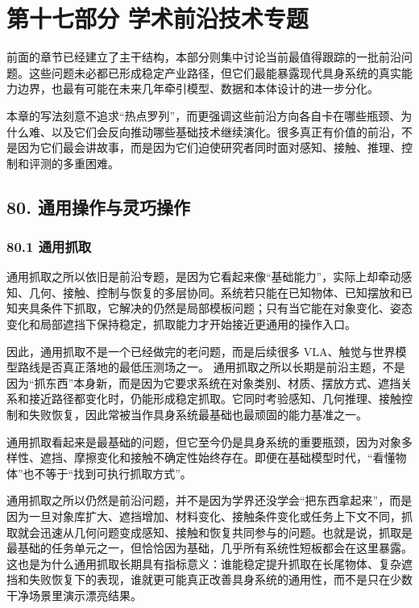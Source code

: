 
\part*{第十七部分 学术前沿技术专题}

前面的章节已经建立了主干结构，本部分则集中讨论当前最值得跟踪的一批前沿问题。这些问题未必都已形成稳定产业路径，但它们最能暴露现代具身系统的真实能力边界，也最有可能在未来几年牵引模型、数据和本体设计的进一步分化。

本章的写法刻意不追求“热点罗列”，而更强调这些前沿方向各自卡在哪些瓶颈、为什么难、以及它们会反向推动哪些基础技术继续演化。很多真正有价值的前沿，不是因为它们最会讲故事，而是因为它们迫使研究者同时面对感知、接触、推理、控制和评测的多重困难。

\chapter*{80. 通用操作与灵巧操作}

\section*{80.1 通用抓取}


通用抓取之所以依旧是前沿专题，是因为它看起来像“基础能力”，实际上却牵动感知、几何、接触、控制与恢复的多层协同。系统若只能在已知物体、已知摆放和已知夹具条件下抓取，它解决的仍然是局部模板问题；只有当它能在对象变化、姿态变化和局部遮挡下保持稳定，抓取能力才开始接近更通用的操作入口。

因此，通用抓取不是一个已经做完的老问题，而是后续很多 VLA、触觉与世界模型路线是否真正落地的最低压测场之一。 通用抓取之所以长期是前沿主题，不是因为“抓东西”本身新，而是因为它要求系统在对象类别、材质、摆放方式、遮挡关系和接近路径都变化时，仍能形成稳定抓取。它同时考验感知、几何推理、接触控制和失败恢复，因此常被当作具身系统最基础也最顽固的能力基准之一。

通用抓取看起来是最基础的问题，但它至今仍是具身系统的重要瓶颈，因为对象多样性、遮挡、摩擦变化和接触不确定性始终存在。即便在基础模型时代，“看懂物体”也不等于“找到可执行抓取方式”。

通用抓取之所以仍然是前沿问题，并不是因为学界还没学会“把东西拿起来”，而是因为一旦对象库扩大、遮挡增加、材料变化、接触条件变化或任务上下文不同，抓取就会迅速从几何问题变成感知、接触和恢复共同参与的问题。也就是说，抓取是最基础的任务单元之一，但恰恰因为基础，几乎所有系统性短板都会在这里暴露。 这也是为什么通用抓取长期具有指标意义：谁能稳定提升抓取在长尾物体、复杂遮挡和失败恢复下的表现，谁就更可能真正改善具身系统的通用性，而不是只在少数干净场景里演示漂亮结果。

